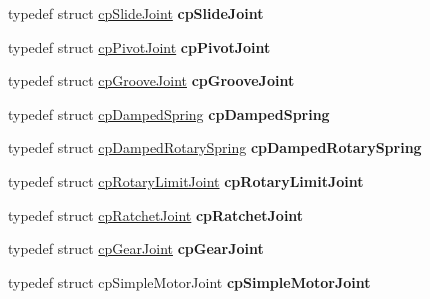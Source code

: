 \begin{DoxyCompactItemize}
\item 
\hypertarget{group__misc_ga22c80982fc779df42ada48f0f35c326c}{}typedef struct \hyperlink{structcp_slide_joint}{cp\+Slide\+Joint} {\bfseries cp\+Slide\+Joint}\label{group__misc_ga22c80982fc779df42ada48f0f35c326c}

\item 
\hypertarget{group__misc_ga6be42317226c36d7c3b71175c31bed55}{}typedef struct \hyperlink{structcp_pivot_joint}{cp\+Pivot\+Joint} {\bfseries cp\+Pivot\+Joint}\label{group__misc_ga6be42317226c36d7c3b71175c31bed55}

\item 
\hypertarget{group__misc_ga4aa4733fb7b33f6650ce92a7d2bf9361}{}typedef struct \hyperlink{structcp_groove_joint}{cp\+Groove\+Joint} {\bfseries cp\+Groove\+Joint}\label{group__misc_ga4aa4733fb7b33f6650ce92a7d2bf9361}

\item 
\hypertarget{group__misc_gab4c3629bf0daa6e27aaff6ac1bdc0fb7}{}typedef struct \hyperlink{structcp_damped_spring}{cp\+Damped\+Spring} {\bfseries cp\+Damped\+Spring}\label{group__misc_gab4c3629bf0daa6e27aaff6ac1bdc0fb7}

\item 
\hypertarget{group__misc_ga48602f8d634857dac76e75f05458aea1}{}typedef struct \hyperlink{structcp_damped_rotary_spring}{cp\+Damped\+Rotary\+Spring} {\bfseries cp\+Damped\+Rotary\+Spring}\label{group__misc_ga48602f8d634857dac76e75f05458aea1}

\item 
\hypertarget{group__misc_ga54615af04b79ce2b9f2dfedc8e702da3}{}typedef struct \hyperlink{structcp_rotary_limit_joint}{cp\+Rotary\+Limit\+Joint} {\bfseries cp\+Rotary\+Limit\+Joint}\label{group__misc_ga54615af04b79ce2b9f2dfedc8e702da3}

\item 
\hypertarget{group__misc_ga574d87330384b10b88666948ea424a50}{}typedef struct \hyperlink{structcp_ratchet_joint}{cp\+Ratchet\+Joint} {\bfseries cp\+Ratchet\+Joint}\label{group__misc_ga574d87330384b10b88666948ea424a50}

\item 
\hypertarget{group__misc_gac590a81b11f1ee5ae26108e24a5b6074}{}typedef struct \hyperlink{structcp_gear_joint}{cp\+Gear\+Joint} {\bfseries cp\+Gear\+Joint}\label{group__misc_gac590a81b11f1ee5ae26108e24a5b6074}

\item 
\hypertarget{group__misc_ga946a6726ce9067b29e944ff0f9309120}{}typedef struct cp\+Simple\+Motor\+Joint {\bfseries cp\+Simple\+Motor\+Joint}\label{group__misc_ga946a6726ce9067b29e944ff0f9309120}


\end{DoxyCompactItemize}
